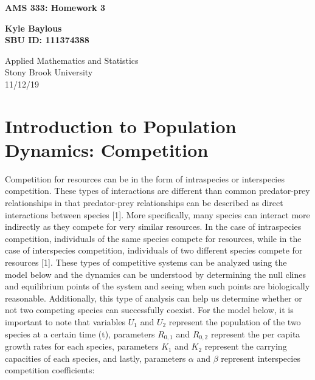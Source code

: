 \documentclass[12pt]{article}
\begin{document}
 

\begin{titlepage}
   \begin{center}
   
       \vspace*{1cm}
 
       \textbf{\Large{AMS 333: Homework 3}}
 
       \vspace{0.5cm}
 
       \vspace{1.5cm}
 
       \textbf{\Large{Kyle Baylous}}\\
       \vspace{1.5cm}
       \textbf{\Large{SBU ID: 111374388}}
 
       \vfill

 
       \vspace{0.8cm}
 
 
       Applied Mathematics and Statistics\\
       Stony Brook University\\
       11/12/19
 
   \end{center}
\end{titlepage}

\section{Introduction to Population Dynamics: Competition }

Competition for resources can be in the form of intraspecies or interspecies competition. These types of interactions are different than common predator-prey relationships in that predator-prey relationships can be described as direct interactions between species [1]. More specifically, many species can interact more indirectly as they compete for very similar resources. In the case of intraspecies competition, individuals of the same species compete for resources, while in the case of interspecies competition, individuals of two different species compete for resources [1]. These types of competitive systems can be analyzed using the model below and the dynamics can be understood by determining the null clines and equilibrium points of the system and seeing when such points are biologically reasonable. Additionally, this type of analysis can help us determine whether or not two competing species can successfully coexist. For the model below, it is important to note that variables $U_1$ and $U_2$ represent the population of the two species at a certain time (t), parameters $R_{0,1}$ and $R_{0,2}$ represent the per capita growth rates for each species, parameters $K_1$ and $K_2$ represent the carrying capacities of each species, and lastly, parameters ${\alpha}$ and ${\beta}$ represent interspecies competition coefficients:
\end{document}
